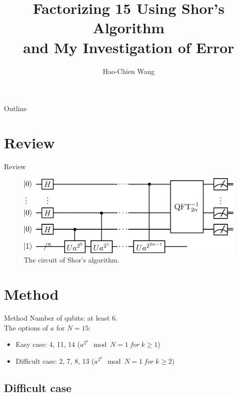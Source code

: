 \documentclass{beamer}
\title[Factorizing 15]{Factorizing 15 Using Shor's Algorithm\\and My Investigation of Error}
\author{Hao-Chien Wang}
\institute[NTUPhys]{Department of Physics, National Taiwan University}
\begin{document}
\begin{frame}
	\titlepage
\end{frame}

\begin{frame}{Outline}
	\tableofcontents
\end{frame}

\section{Review}%
\label{sec:review}

\begin{frame}{Review}
	\begin{figure}[h]
		\centering
		\includegraphics[width=\linewidth]{./figs/simpleshor.png}
		\caption{The circuit of Shor's algorithm.}%
		\label{fig:simpleshor}
	\end{figure}
	
\end{frame}

\section{Method}%
\label{sec:method}

\begin{frame}{Method}
Number of qubits: at least 6.\\
The options of $a$ for $N=15$:
\begin{itemize}
	\item Easy case: 4, 11, 14 ($a^{2^k} \mod N = 1 \: for \: k \geq 1$)
	\item Difficult case: 2, 7, 8, 13 ($a^{2^k} \mod N = 1 \: for \: k \geq 2$)
\end{itemize}
\end{frame}

\subsection{Difficult case}%
\label{sub:difficult_case}
\end{document}
